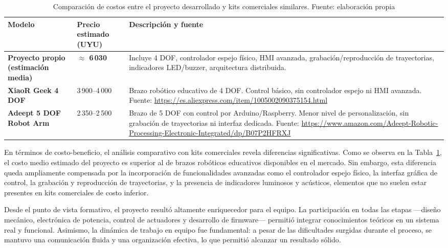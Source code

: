 \begin{table}[H]
\centering
\caption{Comparación de costos entre el proyecto desarrollado y kits comerciales similares. Fuente: elaboración propia}\label{tab:comparacion_costos}
\begin{tabular}{p{} p{} p{}}
\toprule
\textbf{Modelo} & \textbf{Precio estimado (UYU)} & \textbf{Descripción y fuente} \\
\midrule

\textbf{Proyecto propio (estimación media)} 
& \textbf{$\approx$ 6\,030} 
& Incluye 4 DOF, controlador espejo físico, HMI avanzada, grabación/reproducción de trayectorias, indicadores LED/buzzer, arquitectura distribuida. \\
\midrule

\textbf{XiaoR Geek 4 DOF} 
& 3\,900--4\,000 
& Brazo robótico educativo de 4 DOF. Control básico, sin controlador espejo ni HMI avanzada.  
Fuente: \url{https://es.aliexpress.com/item/1005002090375154.html} \\
\midrule

\textbf{Adeept 5 DOF Robot Arm} 
& 2\,350--2\,500 
& Brazo de 5 DOF con control por Arduino/Raspberry. Menor nivel de personalización, sin grabación de trayectorias ni interfaz dedicada.  
Fuente: \url{https://www.amazon.com/Adeept-Robotic-Processing-Electronic-Integrated/dp/B07P2HFRXJ} \\
\bottomrule
\end{tabular}
\end{table}

En términos de costo-beneficio, el análisis comparativo con kits comerciales revela diferencias significativas. Como se observa en la Tabla~\ref{tab:comparacion_costos}, el costo medio estimado del proyecto es superior al de brazos robóticos educativos disponibles en el mercado. Sin embargo, esta diferencia queda ampliamente compensada por la incorporación de funcionalidades avanzadas como el controlador espejo físico, la interfaz gráfica de control, la grabación y reproducción de trayectorias, y la presencia de indicadores luminosos y acústicos, elementos que no suelen estar presentes en kits comerciales de costo inferior.

\vspace{1em}

Desde el punto de vista formativo, el proyecto resultó altamente enriquecedor para el equipo. La participación en todas las etapas —diseño mecánico, electrónica de potencia, control de actuadores y desarrollo de firmware— permitió integrar conocimientos teóricos en un sistema real y funcional. Asimismo, la dinámica de trabajo en equipo fue fundamental: a pesar de las dificultades surgidas durante el proceso, se mantuvo una comunicación fluida y una organización efectiva, lo que permitió alcanzar un resultado sólido.

